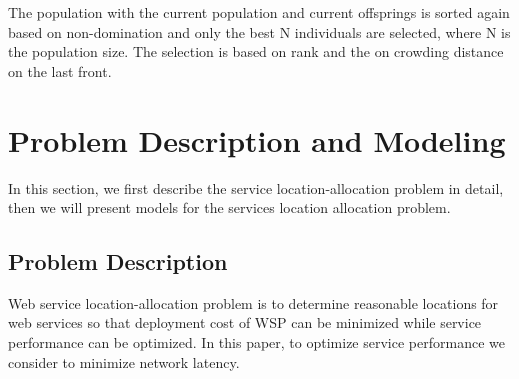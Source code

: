 \documentclass{llncs}
\begin{document}
The population with the current population and current offsprings is sorted again based on non-domination and only the best N individuals are selected, where N is the population size.
The selection is based on rank and the on crowding distance on the last front.

%
%
%
%
%
%
\section{Problem Description and Modeling}
\label{sec:problem}
In this section, we first describe the service location-allocation problem in detail, then we will present models for the services location allocation problem.

\subsection{Problem Description}
Web service location-allocation problem is to determine reasonable locations for web services so that deployment cost of WSP can be minimized while service performance can be optimized.
In this paper, to optimize service performance we consider to minimize network latency.
\end{document}
